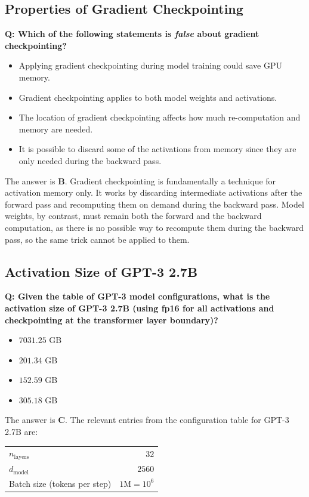 
\subsection{Properties of Gradient Checkpointing}

\textbf{Q: Which of the following statements is \emph{false} about gradient checkpointing?}
\begin{itemize}
    \item[A.] Applying gradient checkpointing during model training could save GPU memory.
    \item[B.] Gradient checkpointing applies to both model weights and activations.
    \item[C.] The location of gradient checkpointing affects how much re-computation and memory are needed.
    \item[D.] It is possible to discard some of the activations from memory since they are only needed during the backward pass.
\end{itemize}

The answer is \textbf{B}. Gradient checkpointing is fundamentally a technique for activation memory only. It works by discarding intermediate activations after the forward pass and recomputing them on demand during the backward pass. Model weights, by contrast, must remain both the forward and the backward computation, as there is no possible way to recompute them during the backward pass, so the same trick cannot be applied to them.

\subsection{Activation Size of GPT-3 2.7B}

\textbf{Q: Given the table of GPT-3 model configurations, what is the activation size of GPT-3 2.7B (using fp16 for all activations and checkpointing at the transformer layer boundary)?}
\begin{itemize}
    \item[A.] $7031.25$ GB
    \item[B.] $201.34$ GB
    \item[C.] $152.59$ GB
    \item[D.] $305.18$ GB
\end{itemize}

The answer is \textbf{C}. The relevant entries from the configuration table for GPT-3 2.7B are:
\begin{center}
\begin{tabular}{lr}
\toprule
$n_{\text{layers}}$ & $32$ \\
$d_{\text{model}}$ & $2560$ \\
Batch size (tokens per step) & $1\text{M} = 10^6$ \\
\bottomrule
\end{tabular}
\end{center}

